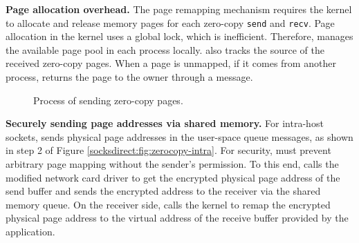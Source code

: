 \textbf{Page allocation overhead.}
The page remapping mechanism requires the kernel to allocate and release memory pages for each zero-copy \texttt{send} and \texttt{recv}.
Page allocation in the kernel uses a global lock, which is inefficient. Therefore, \libipc{} manages the available page pool in each process locally.
\libipc{} also tracks the source of the received zero-copy pages.
When a page is unmapped, if it comes from another process, \libipc{} returns the page to the owner through a message.

\begin{figure}[htbp]
	\centering
	\hspace{0.02\textwidth}
	\caption{Process of sending zero-copy pages.}
\end{figure}

\textbf{Securely sending page addresses via shared memory.}
For intra-host sockets, \libipc{} sends physical page addresses in the user-space queue messages, as shown in step 2 of Figure \ref{socksdirect:fig:zerocopy-intra}.
For security, \sys{} must prevent arbitrary page mapping without the sender's permission.
To this end, \libipc{} calls the modified network card driver to get the encrypted physical page address of the send buffer and sends the encrypted address to the receiver via the shared memory queue.
On the receiver side, \libipc{} calls the kernel to remap the encrypted physical page address to the virtual address of the receive buffer provided by the application.

